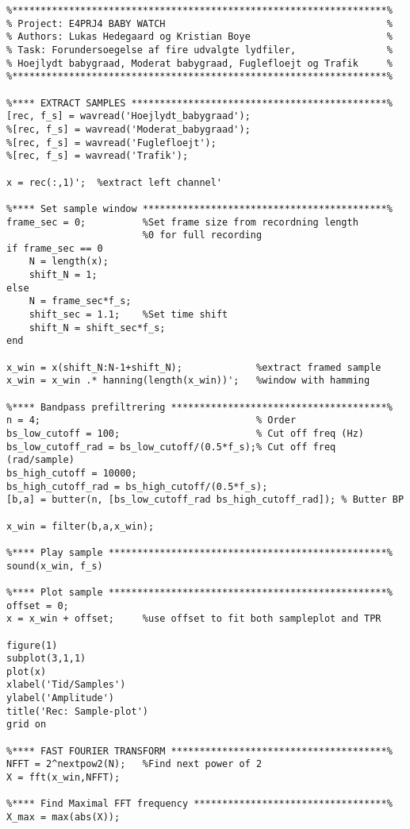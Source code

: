 \begin{verbatim}
%******************************************************************%
% Project: E4PRJ4 BABY WATCH                                       %
% Authors: Lukas Hedegaard og Kristian Boye                        %
% Task: Forundersoegelse af fire udvalgte lydfiler,                %
% Hoejlydt babygraad, Moderat babygraad, Fuglefloejt og Trafik     %
%******************************************************************%

%**** EXTRACT SAMPLES *********************************************%
[rec, f_s] = wavread('Hoejlydt_babygraad');
%[rec, f_s] = wavread('Moderat_babygraad');   
%[rec, f_s] = wavread('Fuglefloejt');
%[rec, f_s] = wavread('Trafik');  

x = rec(:,1)';  %extract left channel'

%**** Set sample window *******************************************%
frame_sec = 0;          %Set frame size from recordning length
                        %0 for full recording
if frame_sec == 0 
    N = length(x);
    shift_N = 1;
else
    N = frame_sec*f_s;
    shift_sec = 1.1;    %Set time shift
    shift_N = shift_sec*f_s;
end

x_win = x(shift_N:N-1+shift_N);             %extract framed sample
x_win = x_win .* hanning(length(x_win))';   %window with hamming

%**** Bandpass prefiltrering **************************************%
n = 4;                                      % Order
bs_low_cutoff = 100;                        % Cut off freq (Hz)
bs_low_cutoff_rad = bs_low_cutoff/(0.5*f_s);% Cut off freq (rad/sample)
bs_high_cutoff = 10000; 
bs_high_cutoff_rad = bs_high_cutoff/(0.5*f_s); 
[b,a] = butter(n, [bs_low_cutoff_rad bs_high_cutoff_rad]); % Butter BP

x_win = filter(b,a,x_win);

%**** Play sample *************************************************%
sound(x_win, f_s)

%**** Plot sample *************************************************%
offset = 0;
x = x_win + offset;     %use offset to fit both sampleplot and TPR

figure(1)
subplot(3,1,1)
plot(x)
xlabel('Tid/Samples')
ylabel('Amplitude')
title('Rec: Sample-plot')
grid on

%**** FAST FOURIER TRANSFORM **************************************% 
NFFT = 2^nextpow2(N);   %Find next power of 2
X = fft(x_win,NFFT);

%**** Find Maximal FFT frequency **********************************%
X_max = max(abs(X));



\end{verbatim}
